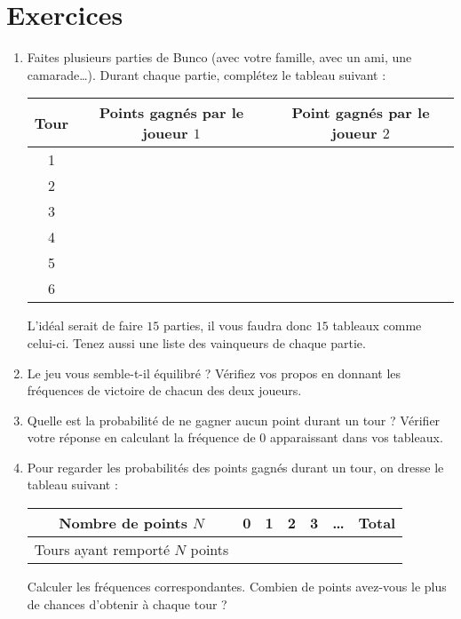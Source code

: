 \documentclass{article}
\begin{document}
\section{Exercices}
\begin{enumerate}
\item Faites plusieurs parties de Bunco (avec votre famille, avec un ami, une camarade\dots). Durant chaque partie, complétez le tableau suivant :
\begin{center}
\begin{tabular}{|c|c|c|}
\hline
Tour & Points gagnés par le joueur $1$ & Point gagnés par le joueur $2$\\
\hline
1 & &\\ 
\hline
2 & &\\ 
\hline
3 & &\\ 
\hline
4 & &\\ 
\hline
5 & &\\ 
\hline
6 & &\\ 
\hline     
\end{tabular} 
\end{center}
L'idéal serait de faire $15$ parties, il vous faudra donc $15$ tableaux comme celui-ci. Tenez aussi une liste des vainqueurs de chaque partie.
\item Le jeu vous semble-t-il équilibré ? Vérifiez vos propos en donnant les fréquences de victoire de chacun des deux joueurs.
\item Quelle est la probabilité de ne gagner aucun point durant un tour ? Vérifier votre réponse en calculant la fréquence de $0$ apparaissant dans vos tableaux.
\item Pour regarder les probabilités des points gagnés durant un tour, on dresse le tableau suivant :
\begin{center}
\begin{tabular}{|c|c|c|c|c|c|c|}
\hline
Nombre de points $N$ & 0 & 1 & 2 & 3 & \dots & Total\\
\hline
Tours ayant remporté $N$ points & & & & & &\\
\hline
\end{tabular}    
\end{center}
Calculer les fréquences correspondantes. Combien de points avez-vous le plus de chances d'obtenir à chaque tour ?
\end{enumerate}
\end{document}
